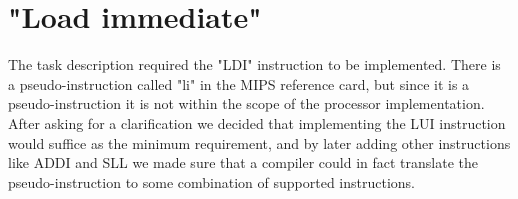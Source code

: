 \section{"Load immediate"}
The task description required the "LDI" instruction to be implemented.
There is a pseudo-instruction called "li" in the MIPS reference card,
but since it is a pseudo-instruction it is not within the scope of the processor implementation.
After asking for a clarification we decided that implementing the LUI instruction would suffice as the minimum requirement,
and by later adding other instructions like ADDI and SLL we made sure that a compiler could in fact translate the pseudo-instruction to some combination of supported instructions.
